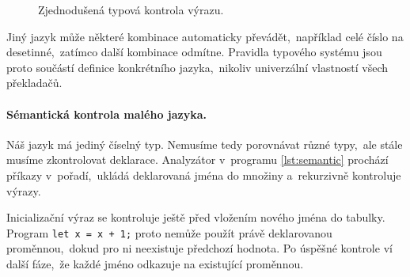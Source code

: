 \begin{figure}[h]
    \centering
    
    \caption{Zjednodušená typová kontrola výrazu.}
    \label{fig:typova-kontrola}
\end{figure}

Jiný jazyk může některé kombinace automaticky převádět,~například celé číslo na desetinné,~zatímco další kombinace odmítne. Pravidla typového systému jsou proto součástí definice konkrétního jazyka,~nikoliv univerzální vlastností všech překladačů.

\paragraph{Sémantická kontrola malého jazyka.}

Náš jazyk má jediný číselný typ. Nemusíme tedy porovnávat různé typy,~ale stále musíme zkontrolovat deklarace. Analyzátor v~programu \ref{lst:semantic} prochází příkazy v~pořadí,~ukládá deklarovaná jména do množiny a~rekurzivně kontroluje výrazy.



Inicializační výraz se kontroluje ještě před vložením nového jména do tabulky. Program \texttt{let x = x + 1;} proto nemůže použít právě deklarovanou proměnnou,~dokud pro ni neexistuje předchozí hodnota. Po úspěšné kontrole ví další fáze,~že každé jméno odkazuje na existující proměnnou.

